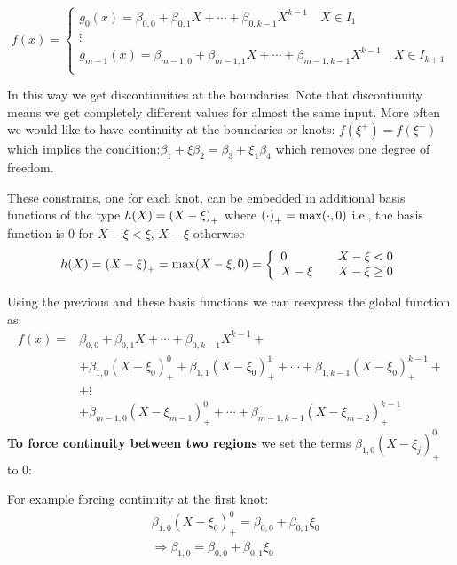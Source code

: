 \documentclass[12pt, letterpaper]{article}
\theoremstyle{definition}
\DeclarePairedDelimiter\autobracket{(}{)}
\newcommand{\br}[1]{\autobracket*{#1}}
\begin{document}
\begin{equation}
f(x) = \left\{ \begin{array}{ll} g_0(x) = \beta_{0,0} + \beta_{0,1} X + \cdots + \beta_{0,k-1} X^{k-1}\quad X \in I_1 \\ 
\vdots\\
 g_{m-1}(x) = \beta_{m-1,0} + \beta_{m-1,1} X + \cdots + \beta_{m-1,k-1} X^{k-1}\quad X \in I_{k+1} \\  \quad 
\end{array}
 \right.
\end{equation}

In this way we get discontinuities at the boundaries. Note that discontinuity means we get completely different values for almost the same input. More often we would like to have continuity at the boundaries or knots: $f(\xi^+)=f(\xi^-)$ which implies the condition:$\beta_1 +\xi\beta_2 = \beta_3 +\xi_1\beta_4$ which removes one degree of freedom.

These constrains, one for each knot, can be embedded in additional basis functions of the type $h(X) = \br{X - \xi}_+$ where $\br{\cdot}_+ = \max(\cdot, 0)$ i.e., the basis function is $0$ for $X - \xi<\xi$, $X - \xi$ otherwise
\begin{equation}
h(X) = \br{X - \xi}_+ = \max(X - \xi, 0) = \left\{ \begin{array}{ll}  0 &\quad X-\xi<0\\
X-\xi &\quad X-\xi\ge0
\end{array}
 \right.
\end{equation}

Using the previous and these basis functions we can reexpress the global function as:
\begin{equation}
\begin{aligned}
f(x) =& \beta_{0,0} + \beta_{0,1}X +\cdots+\beta_{0,k-1}  X^{k-1} + \\
&+\beta_{1,0}(X -\xi_0)_+^0     + \beta_{1,1}(X -\xi_0)_+^1       +\cdots +\beta_{1,k-1} (X -\xi_0)_+^{k-1}+  \\
&+\vdots \\ 
&+\beta_{m-1,0}(X -\xi_{m-1})_+^0 +\cdots +\beta_{m-1,k-1} (X -\xi_{m-2})_+^{k-1}
\end{aligned}
\end{equation}
\textbf{To force continuity between two regions} we set the terms $\beta_{1,0}(X -\xi_j)_+^0$ to $0$:

For example forcing continuity at the first knot:
\begin{equation}
\begin{aligned}
&\beta_{1,0}(X -\xi_0)_+^0 = \beta_{0,0} + \beta_{0,1} \xi_0\\
&\Rightarrow \beta_{1,0} = \beta_{0,0} + \beta_{0,1} \xi_0
\end{aligned}
\end{equation}
\end{document}
